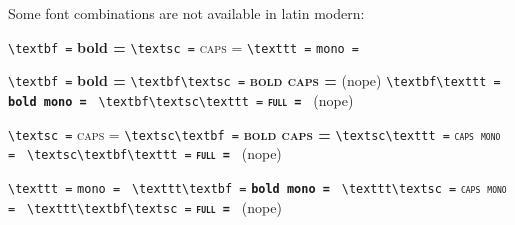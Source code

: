\documentclass{article}
\begin{document}


\setlength{\parindent}{0pt}
\obeylines

Some font combinations are not available in latin modern:
\bigskip

\verb`\textbf =` \textbf{bold = \fontname\font}
\verb`\textsc =` \textsc{caps = \fontname\font}
\verb`\texttt =` \texttt{mono = \fontname\font}

\bigskip
\verb`\textbf =` \textbf{bold = \fontname\font}
\verb`\textbf\textsc =` \textbf{\textsc{bold caps = \fontname\font}} (nope)
\verb`\textbf\texttt =` \textbf{\texttt{bold mono = \fontname\font}}
\verb`\textbf\textsc\texttt =` \textbf{\textsc{\texttt{full = \fontname\font}}} (nope)

\bigskip
\verb`\textsc =` \textsc{caps = \fontname\font}
\verb`\textsc\textbf =` \textsc{\textbf{bold caps = \fontname\font}}
\verb`\textsc\texttt =` \textsc{\texttt{caps mono = \fontname\font}}
\verb`\textsc\textbf\texttt =` \textsc{\textbf{\texttt{full = \fontname\font}}} (nope)

\bigskip
\verb`\texttt =` \texttt{mono = \fontname\font}
\verb`\texttt\textbf =` \texttt{\textbf{bold mono = \fontname\font}}
\verb`\texttt\textsc =` \texttt{\textsc{caps mono = \fontname\font}}
\verb`\texttt\textbf\textsc =` \texttt{\textbf{\textsc{full = \fontname\font}}} (nope)
\end{document}

